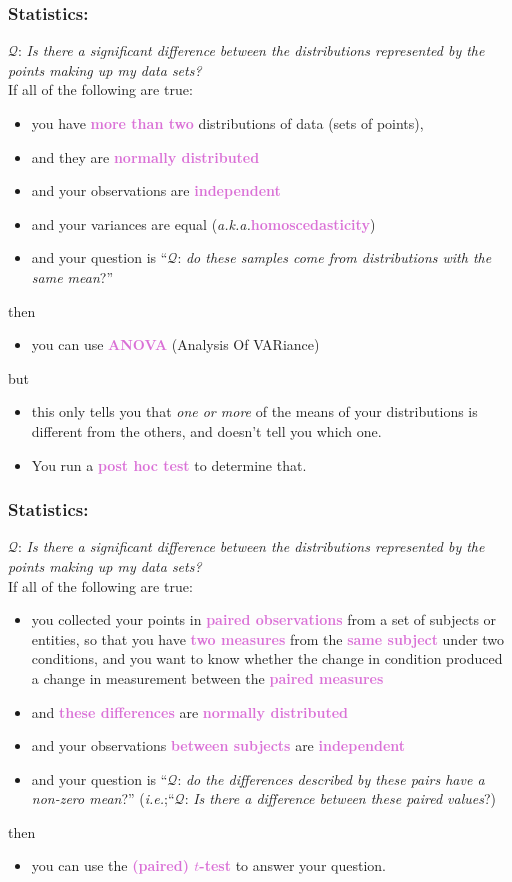 \documentclass{beamer}
\newcommand{\ie}{\textit{i.e.};\xspace}
\newcommand{\aka}{\textit{a.k.a.}\xspace}
\newcommand{\key}[1]{\textcolor{orchid}{{\bf #1}}}
\newcommand{\kq}[1]{\textcolor{burntumber}{$\mathcal{Q}$: \emph{#1}}}
\begin{document}
\begin{frame}
\frametitle{Statistics: }
\kq{Is there a significant difference between the distributions represented by the points making up my data sets?}\\
If all of the following are true:
\begin{itemize}
\item you have \key{\bf more than two} distributions of data (sets of points),
\item and they are \key{normally distributed} 
\item and your observations are \key{independent}
\item and your variances are equal (\aka \key{homoscedasticity}) 
\item and your question is ``\kq{do these samples come
		from distributions with the same mean}?''
\end{itemize}
then \pause
\begin{itemize}
\item you can use \key{ANOVA} (Analysis Of VARiance)
\end{itemize}
but \pause
\begin{itemize}
\item this only tells you that \emph{one or more} of the means of
	your distributions is different from the others, and doesn't tell
	you which one.
\item \pause You run a \key{post hoc test} to determine that.
\end{itemize}
\end{frame}

\begin{frame}
\frametitle{Statistics: }
\kq{Is there a significant difference between the distributions represented by the points making up my data sets?}\\
If all of the following are true:
\begin{itemize}
\item you collected your points in \key{paired observations}
from a set of subjects or entities, so that you have \key{two measures}
from the \key{same subject} under two conditions, and you want to know
whether the change in condition produced a change in measurement
between the \key{paired measures}
\item and \key{these differences} are \key{normally distributed} \pause
\item and your observations \key{between subjects} are \key{independent} \pause
\item and your question is ``\kq{do the differences described by
		these pairs have a non-zero mean}?'' (\ie ``\kq{Is there
			a difference between these paired values}?)
\end{itemize}
then \pause
\begin{itemize}
\item you can use the \key{(paired) $t$-test}
to answer your question.
\end{itemize}
\end{frame}
\end{document}
